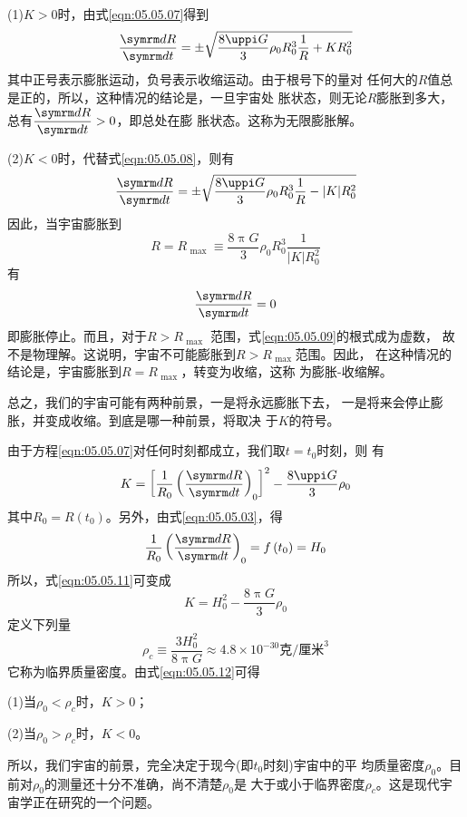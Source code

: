 (1)$ K > 0 $时，由式\eqref{eqn:05.05.07}得到
\begin{equation}\label{eqn:05.05.08}
  \frac { \dif R } { \dif t } = \pm \sqrt { \frac { 8 \uppi G } { 3 } \rho _ { 0 } R _ { 0 } ^ { 3 } \frac { 1 } { R } + K R _ 0 ^ { 2 } }
\end{equation}
其中正号表示膨胀运动，负号表示收缩运动。由于根号下的量对
任何大的$ R $值总是正的，所以，这种情况的结论是，一旦宇宙处
胀状态，则无论$ R $膨胀到多大，总有$ \dfrac { \dif R } { \dif t } > 0 $，即总处在膨
胀状态。这称为无限膨胀解。

(2)$ K < 0 $时，代替式\eqref{eqn:05.05.08}，则有
\begin{equation}\label{eqn:05.05.09}
  \frac { \dif R } { \dif t } = \pm \sqrt { \frac { 8 \uppi G } { 3 } \rho _ { 0 } R _ { 0 } ^ { 3 } \frac { 1 } { R } - | K | R _ 0 ^ { 2 } }
\end{equation}
因此，当宇宙膨胀到
\begin{equation}\label{eqn:05.05.10}
  R = R _ { \text { max } } \equiv \frac { 8 \uppi G } { 3 } \rho _ { 0 } R _ { 0 } ^ { 3 } \frac { 1 } { | K | R _ { 0 } ^ 2 }
\end{equation}
有
\begin{equation*}
  \frac { \dif R } { \dif t } = 0
\end{equation*}
即膨胀停止。而且，对于$ R > R _ { \text { max } } $ 范围，式\eqref{eqn:05.05.09}的根式成为虚数，
故不是物理解。这说明，宇宙不可能膨胀到$ R > R _ { \text { max } } $范围。因此，
在这种情况的结论是，宇宙膨胀到$ R = R _ { \text { max } } $，转变为收缩，这称
为膨胀-收缩解。

总之，我们的宇宙可能有两种前景，一是将永远膨胀下去，
一是将来会停止膨胀，并变成收缩。到底是哪一种前景，将取决
于$ K $的符号。

由于方程\eqref{eqn:05.05.07}对任何时刻都成立，我们取$ t=t_0 $时刻，则
有
\begin{equation}\label{eqn:05.05.11}
  K = \left[ \frac { 1 } { R _ { 0 } } \left( \frac { \dif R } { \dif t } \right) _ 0 \right] ^ { 2 } - \frac { 8 \uppi G } { 3 } \rho _ { 0 }
\end{equation}
其中$ R _ { 0 } = R \left( t _ { 0 } \right) $。另外，由式\eqref{eqn:05.05.03}，得
\begin{equation*}
  \frac { 1 } { R _ { 0 } } \left( \frac { \dif R } { \dif t } \right) _ { 0 } = f \left( t _ { 0 } \right) = H _ { 0 }
\end{equation*}
所以，式\eqref{eqn:05.05.11}可变成
\clearpage
\begin{equation}\label{eqn:05.05.12}
  K = H _ 0 ^ { 2 } - \frac { 8 \uppi G } { 3 } \rho _ { 0 }
\end{equation}
定义下列量
\begin{equation*}
  \rho _ { c } \equiv \frac { 3 H _ 0 ^ { 2 } } { 8 \uppi G } \approx 4.8 \times 10 ^ { -30 } \text{克/厘米} ^ 3
\end{equation*}
它称为临界质量密度。由式\eqref{eqn:05.05.12}可得

(1)当$ \rho _ { 0 } < \rho _ { c } $时，$ K > 0 $；

(2)当$ \rho _ { 0 } > \rho _ { c } $时，$ K < 0 $。

\noindent 所以，我们宇宙的前景，完全决定于现今(即$ t _ { 0 } $时刻)宇宙中的平
均质量密度$ \rho _ { 0 } $。目前对$ \rho _ { 0 } $的测量还十分不准确，尚不清楚$ \rho _ { 0 } $是
大于或小于临界密度$ \rho _ { c } $。这是现代宇宙学正在研究的一个问题。